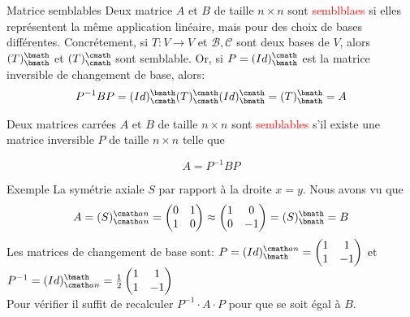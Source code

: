 \begin{parag}{Matrice semblables}
    Deux matrice $A$ et $B$ de taille $n \times n$ sont \textcolor{red}{semblblaes} si elles représentent la même application linéaire, mais pour des choix de bases différentes. Concrétement, si $T : V \to V$ et $\mathcal{B}, \mathcal{C}$ sont deux bases de $V$, alors $(T)_\bmath^\bmath$ et $(T)_\cmath^\cmath$ sont semblable. Or, si $P = (Id)_\bmath^\cmath$ est la matrice inversible de changement de base, alors:
    \[P^{-1}BP = (Id)_\cmath^\bmath(T)_\cmath^\cmath(Id)_\bmath^\cmath = (T)_\bmath^\bmath = A\]

    \begin{definition}
        Deux matrices carrées $A$ et $B$ de taille $n\times n$ sont \textcolor{red}{semblables} s'il existe une matrice inversible $P$ de taille $n \times n$ telle que 
        \begin{formule}
            \[A = P^{-1}BP\]
        \end{formule}
    \end{definition}

    \begin{subparag}{Exemple}
        La symétrie axiale $S$ par rapport à la droite $x = y$. Nous avons vu que
        \[A = (S)_{\cmath an}^{\cmath an} = \begin{pmatrix}
            0 & 1 \\
            1 & 0
        \end{pmatrix} \approx \begin{pmatrix}
            1 & 0 \\ 0 & -1
        \end{pmatrix} = (S)_\bmath^\bmath = B\]
        Les matrices de changement de base sont:
        $P = (Id)_\bmath^{\cmath an} = \begin{pmatrix}
            1 & 1 \\ 1 & -1
        \end{pmatrix}$ et $P^{-1} = (Id)_{\cmath an}^\bmath = \frac{1}{2}\begin{pmatrix}
            1 & 1 \\ 1 & -1
        \end{pmatrix}$
        \\
        Pour vérifier il suffit de recalculer $P^{-1}\cdot A \cdot P$ pour que se soit égal à $B$.
    \end{subparag}
\end{parag}

